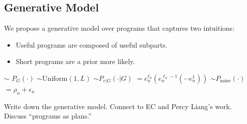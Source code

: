 \documentclass{article} %
\begin{document}
\subsection{Generative Model}
We propose a generative model over programs that captures two intuitions:
\begin{itemize}
\item{Useful programs are composed of useful subparts.}
\item{Short programs are a prior more likely.}
\end{itemize}
\begin{codebox}
\li {} $\sim$ $P_G(\cdot)$ 
\li {} $\sim\mbox{Uniform}(1, L)$ 
\li {}
\li {} $\sim P_{e|G}(\cdot | G)$
\li {} $= e_n^{\ell_n} (e_n^{\ell_n-1} ( \cdots e_n^{1}))$
\li {}
\li {} $\sim P_{\mbox{noise}}(\cdot)$
\li {} $= \rho_n + \epsilon_n$
\end{codebox}


Write down the generative model. Connect to EC and Percy Liang's work. Discuss ``programs as plans.''
\end{document}
